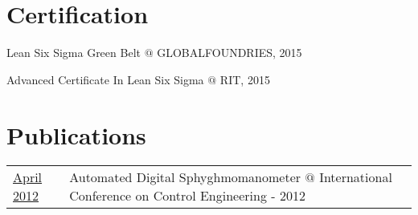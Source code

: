 \documentclass[]{bigfatnoob-resume}
\begin{document}
\begin{minipage}[t]{0.66\textwidth}
		\section{Certification}
		\vspace{\topsep}
		\begin{tightemize}
			\item {\ibf Lean Six Sigma Green Belt} $@$ GLOBALFOUNDRIES, 2015
			\item {\ibf Advanced Certificate In Lean Six Sigma} $@$ RIT, 2015
		\end{tightemize}
		
		
		\section{Publications} 
		\begin{tabular}{p{2cm}p{9.2cm}}
			\href{http://sandeepmohan.com/files/Digital_Sphygmomanometer.pdf}{April 2012} & {\ibf Automated Digital Sphyghmomanometer} $@$ International Conference on Control Engineering - 2012\\
		\end{tabular}
		\sectionsep
		
	\end{minipage} 
\end{document}
